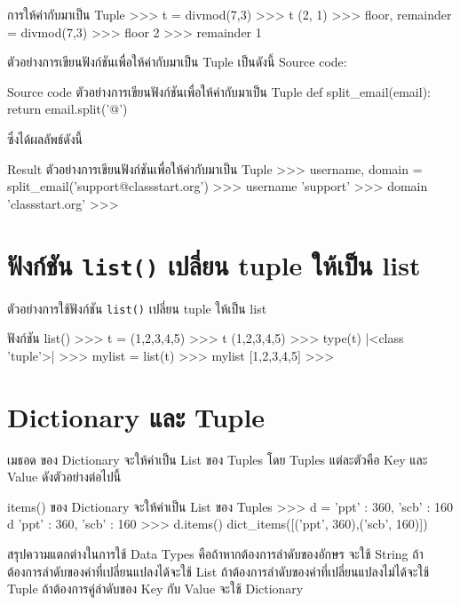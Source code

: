 \begin{codelist}{การให้ค่ากับมาเป็น Tuple}{}
>>> t = divmod(7,3)
>>> t
(2, 1)
>>> floor, remainder = divmod(7,3)
>>> floor
2
>>> remainder
1
\end{codelist}

ตัวอย่างการเขียนฟังก์ชันเพื่อให้ค่ากับมาเป็น Tuple เป็นดังนี้
Source code:
\begin{codelist}{Source code ตัวอย่างการเขียนฟังก์ชันเพื่อให้ค่ากับมาเป็น Tuple}{}
def split_email(email):
    return email.split('@')
\end{codelist}

ซึ่งได้ผลลัพธ์ดังนี้
\begin{codelist}{Result ตัวอย่างการเขียนฟังก์ชันเพื่อให้ค่ากับมาเป็น Tuple}{}
>>> username, domain = split_email('support@classstart.org')
>>> username
'support'
>>> domain
'classstart.org'
>>>
\end{codelist}

\section{ฟังก์ชัน \texttt{list()} เปลี่ยน tuple ให้เป็น list}

ตัวอย่างการใช้ฟังก์ชัน \texttt{list()} เปลี่ยน tuple ให้เป็น list

\begin{codelist}{ฟังก์ชัน list()}{}
>>> t = (1,2,3,4,5)
>>> t
(1,2,3,4,5)
>>> type(t)
|<class \rq{}tuple\rq{}>|
>>> mylist = list(t)
>>> mylist
[1,2,3,4,5]
>>>
\end{codelist}


\section{Dictionary และ Tuple}

เมธอด   ของ Dictionary จะให้ค่าเป็น List  ของ Tuples โดย Tuples แต่ละตัวคือ Key และ Value ดังตัวอย่างต่อไปนี้

\begin{codelist}{items() ของ Dictionary จะให้ค่าเป็น List ของ Tuples}{}
>>> d = {'ppt' : 360, 'scb' : 160}
d
{'ppt' : 360, 'scb' : 160}
>>> d.items()
dict_items([('ppt', 360),('scb', 160)])
\end{codelist}


สรุปความแตกต่างในการใช้ Data Types คือถ้าหากต้องการลำดับของอักษร จะใช้ String ถ้าต้องการลำดับของค่าที่เปลี่ยนแปลงได้จะใช้ List ถ้าต้องการลำดับของค่าที่เปลี่ยนแปลงไม่ได้จะใช้ Tuple ถ้าต้องการคู่ลำดับของ Key กับ Value จะใช้ Dictionary

